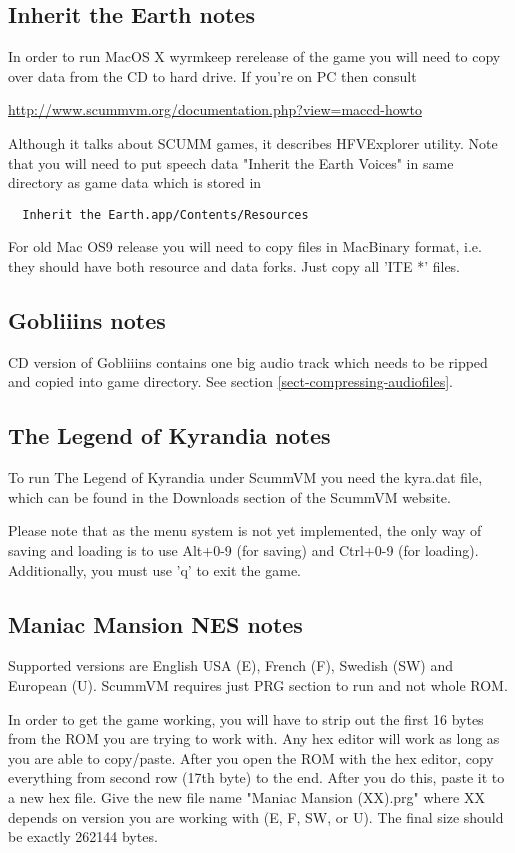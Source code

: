 \subsection{Inherit the Earth notes}
In order to run MacOS X wyrmkeep rerelease of the game you will need to copy
over data from the CD to hard drive. If you're on PC then consult

\url{http://www.scummvm.org/documentation.php?view=maccd-howto}

Although it talks about SCUMM games, it describes HFVExplorer utility. Note
that you will need to put speech data "Inherit the Earth Voices" in same
directory as game data which is stored in

\begin{verbatim}
  Inherit the Earth.app/Contents/Resources
\end{verbatim}

For old Mac OS9 release you will need to copy files in MacBinary format,
i.e. they should have both resource and data forks. Just copy all 'ITE *' files.


\subsection{Gobliiins notes}
CD version of Gobliiins contains one big audio track which needs to be ripped
and copied into game directory. See section \ref{sect-compressing-audiofiles}.

\subsection{The Legend of Kyrandia notes}
To run The Legend of Kyrandia under ScummVM you need the kyra.dat file,
which can be found in the Downloads section of the ScummVM website.

Please note that as the menu system is not yet implemented, the
only way of saving and loading is to use Alt+0-9 (for saving) and
Ctrl+0-9 (for loading). Additionally, you must use 'q' to exit the
game.

\subsection{Maniac Mansion NES notes}
Supported versions are English USA (E), French (F), Swedish (SW) and 
European (U). ScummVM requires just PRG section to run and not whole ROM.

In order to get the game working, you will have to strip out the first
16 bytes from the ROM you are trying to work with. Any hex editor will work 
as long as you are able to copy/paste.  After you open the ROM with the 
hex editor, copy everything from second row (17th byte) to the end. After
you do this, paste it to a new hex file. Give the new file name 
"Maniac Mansion (XX).prg" where XX depends on version you are  working 
with (E, F, SW, or U).  The final size should be exactly 262144 bytes.

